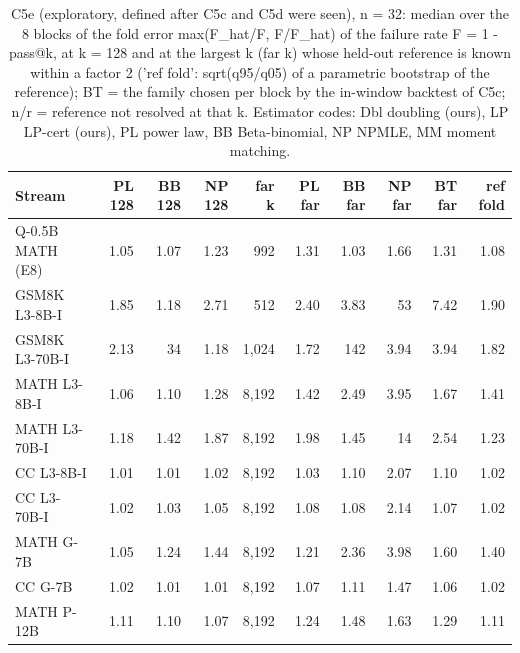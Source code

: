 \begin{table}[t]
\centering
\small
\begin{tabular}{lrrrrrrrrr}
\toprule
Stream & PL 128 & BB 128 & NP 128 & far k & PL far & BB far & NP far & BT far & ref fold \\
\midrule
Q-0.5B MATH (E8) & 1.05 & 1.07 & 1.23 & 992 & 1.31 & 1.03 & 1.66 & 1.31 & 1.08 \\
GSM8K L3-8B-I & 1.85 & 1.18 & 2.71 & 512 & 2.40 & 3.83 & 53 & 7.42 & 1.90 \\
GSM8K L3-70B-I & 2.13 & 34 & 1.18 & 1,024 & 1.72 & 142 & 3.94 & 3.94 & 1.82 \\
MATH L3-8B-I & 1.06 & 1.10 & 1.28 & 8,192 & 1.42 & 2.49 & 3.95 & 1.67 & 1.41 \\
MATH L3-70B-I & 1.18 & 1.42 & 1.87 & 8,192 & 1.98 & 1.45 & 14 & 2.54 & 1.23 \\
CC L3-8B-I & 1.01 & 1.01 & 1.02 & 8,192 & 1.03 & 1.10 & 2.07 & 1.10 & 1.02 \\
CC L3-70B-I & 1.02 & 1.03 & 1.05 & 8,192 & 1.08 & 1.08 & 2.14 & 1.07 & 1.02 \\
MATH G-7B & 1.05 & 1.24 & 1.44 & 8,192 & 1.21 & 2.36 & 3.98 & 1.60 & 1.40 \\
CC G-7B & 1.02 & 1.01 & 1.01 & 8,192 & 1.07 & 1.11 & 1.47 & 1.06 & 1.02 \\
MATH P-12B & 1.11 & 1.10 & 1.07 & 8,192 & 1.24 & 1.48 & 1.63 & 1.29 & 1.11 \\
\bottomrule
\end{tabular}
\caption{C5e (exploratory, defined after C5c and C5d were seen), n = 32: median over the 8 blocks of the fold error max(F\_hat/F, F/F\_hat) of the failure rate F = 1 - pass@k, at k = 128 and at the largest k (far k) whose held-out reference is known within a factor 2 ('ref fold': sqrt(q95/q05) of a parametric bootstrap of the reference); BT = the family chosen per block by the in-window backtest of C5c; n/r = reference not resolved at that k. Estimator codes: Dbl doubling (ours), LP LP-cert (ours), PL power law, BB Beta-binomial, NP NPMLE, MM moment matching.}
\label{tab:T16_relative_failure_rate_errors}
\end{table}
